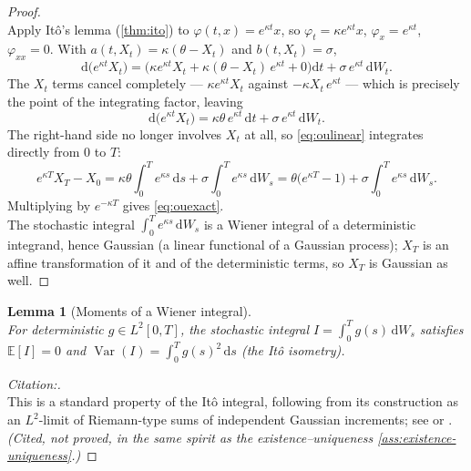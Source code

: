 \documentclass[11pt]{report}
\newcommand{\E}{\mathbb{E}}
\newcommand{\Var}{\operatorname{Var}}
\newcommand{\dd}{\mathrm{d}}
\newcommand{\dW}{\dd W_t}
\newcommand{\dt}{\dd t}
\newcommand{\drift}{a}
\newcommand{\diff}{b}
\theoremstyle{plain}
\newtheorem{lemma}{Lemma}[chapter]
\theoremstyle{definition}
\theoremstyle{remark}
\numberwithin{equation}{chapter}
\begin{document}
\begin{proof}
  \leavevmode\\
Apply It\^o's lemma (\cref{thm:ito}) to
$\varphi(t,x)=e^{\kappa t}x$, so $\varphi_t=\kappa e^{\kappa t}x$, $\varphi_x=e^{\kappa
t}$, $\varphi_{xx}=0$. With $\drift(t,X_t)=\kappa(\theta-X_t)$ and
$\diff(t,X_t)=\sigma$,
\[
   \dd\big(e^{\kappa t}X_t\big)
     = \Big(\kappa e^{\kappa t}X_t + \kappa(\theta-X_t)\,e^{\kappa t}
             + 0\Big)\dt + \sigma\,e^{\kappa t}\,\dW .
\]
The $X_t$ terms cancel completely --- $\kappa e^{\kappa t}X_t$ against
$-\kappa X_t\,e^{\kappa t}$ --- which is precisely the point of the
integrating factor, leaving
\begin{equation}\label{eq:oulinear}
   \dd\big(e^{\kappa t}X_t\big) = \kappa\theta\,e^{\kappa t}\,\dt
                                   + \sigma\,e^{\kappa t}\,\dW .
\end{equation}
The right-hand side no longer involves $X_t$ at all, so
\eqref{eq:oulinear} integrates directly from $0$ to $T$:
\[
   e^{\kappa T}X_T - X_0
     = \kappa\theta\int_0^T e^{\kappa s}\,\dd s
       + \sigma\int_0^T e^{\kappa s}\,\dd W_s
     = \theta\big(e^{\kappa T}-1\big)
       + \sigma\int_0^T e^{\kappa s}\,\dd W_s .
\]
Multiplying by $e^{-\kappa T}$ gives \eqref{eq:ouexact}.
\\The stochastic
integral $\int_0^T e^{\kappa s}\,\dd W_s$ is a Wiener integral of a
deterministic integrand, hence Gaussian (a linear functional of a
Gaussian process); $X_T$ is an affine transformation of it and of the
deterministic terms, so $X_T$ is Gaussian as well.
\end{proof}

\begin{lemma}[Moments of a Wiener integral]\label{lem:ito-isometry}
  \leavevmode\\
For deterministic $g\in L^2[0,T]$, the stochastic integral
$I=\int_0^T g(s)\,\dd W_s$ satisfies $\E[I]=0$ and
$\Var(I)=\int_0^T g(s)^2\,\dd s$ (the It\^o isometry).
\end{lemma}

\begin{proof}[Citation:]
  \leavevmode\\
This is a standard property of the It\^o integral, following from its
construction as an $L^2$-limit of Riemann-type sums of independent
Gaussian increments; see  or
. \emph{(Cited, not proved, in the same spirit
as the existence--uniqueness \cref{ass:existence-uniqueness}.)}
\end{proof}
\end{document}
